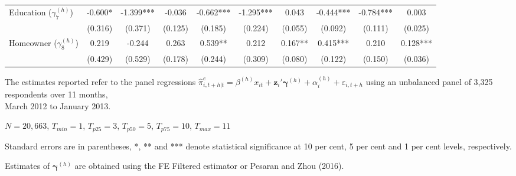 \begin{table}[!h]
\begin{threeparttable}
\begin{tabular}{|l|ccc|ccc|ccc|}
Education ($\gamma^{(h)}_7$) & -0.600* & -1.399*** & -0.036 & -0.662*** & -1.295*** & 0.043 & -0.444*** & -0.784*** & 0.003 \\ 
 & (0.316) & (0.371) & (0.125)& (0.185) & (0.224) & (0.055)& (0.092) & (0.111) & (0.025) \\ \bottomrule
Homeowner ($\gamma^{(h)}_8$) & 0.219 & -0.244 & 0.263 & 0.539** & 0.212 & 0.167** & 0.415*** & 0.210 & 0.128*** \\ 
 & (0.429) & (0.529) & (0.178)& (0.244) & (0.309) & (0.080)& (0.122) & (0.150) & (0.036) \\ \bottomrule
\end{tabular} 
\begin{tablenotes} 
\item The  estimates reported refer to the panel regressions  $\hat{\pi}^e_{i,t+h|t}=\beta^{(h)} x_{i t}+\mathbf{z}_{i}\prime\mathbf{\gamma }^{(h)}+\alpha_i^{(h)}+\varepsilon_{i,t+h}$  using an unbalanced panel of 3,325 respondents over 11 months,\\  March 2012 to January 2013.
\item $N=20,663$, $T_{min}=1$, $T_{p25}=3$, $T_{p50}=5$, $T_{p75}=10$,    $T_{max}=11$
\item Standard errors are in parentheses, *, ** and *** denote statistical significance at 10 per cent, 5 per cent and 1 per cent levels, respectively. 
\item Estimates of $\mathbf{\gamma}^{(h)}$ are obtained using the  FE Filtered estimator or Pesaran and Zhou (2016). 
  \end{tablenotes} 
\end{threeparttable} 
\end{table} 
